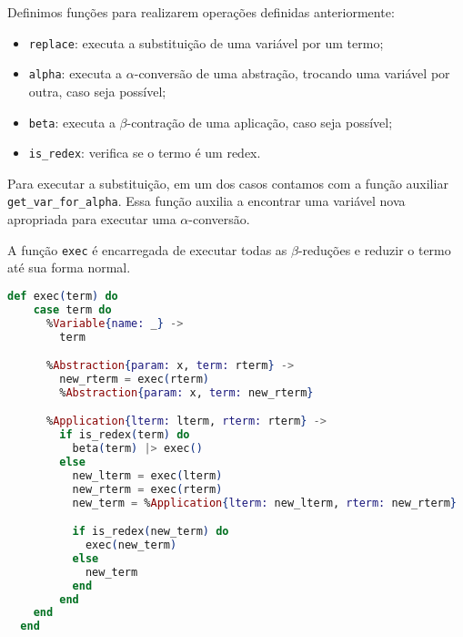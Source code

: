 \documentclass[12pt]{article}
\begin{document}
Definimos funções para realizarem operações definidas anteriormente:
\begin{itemize}
	\item \texttt{replace}: executa a substituição de uma variável por um termo;
	\item \texttt{alpha}: executa a $\alpha$-conversão de uma abstração, trocando uma variável por outra, caso seja possível;
	\item \texttt{beta}: executa a $\beta$-contração de uma aplicação, caso seja possível;
	\item \texttt{is\_redex}: verifica se o termo é um redex.
\end{itemize}

Para executar a substituição, em um dos casos contamos com a função auxiliar \texttt{get\_var\_for\_alpha}. Essa função auxilia a encontrar uma variável nova apropriada para executar uma $\alpha$-conversão.

A função \texttt{exec} é encarregada de executar todas as $\beta$-reduções e reduzir o termo até sua forma normal.

\begin{lstlisting}[language=elixir, caption=Função \texttt{exec}]
  def exec(term) do
    case term do
      %Variable{name: _} ->
        term

      %Abstraction{param: x, term: rterm} ->
        new_rterm = exec(rterm)
        %Abstraction{param: x, term: new_rterm}

      %Application{lterm: lterm, rterm: rterm} ->
        if is_redex(term) do
          beta(term) |> exec()
        else
          new_lterm = exec(lterm)
          new_rterm = exec(rterm)
          new_term = %Application{lterm: new_lterm, rterm: new_rterm}

          if is_redex(new_term) do
            exec(new_term)
          else
            new_term
          end
        end
    end
  end
\end{lstlisting}


\nocite{*}


\end{document}
